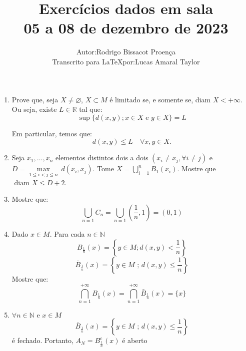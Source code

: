 \documentclass[12pt]{article}
\title{Exercícios dados em sala\\ 05 a 08 de dezembro de 2023}
\author{
    \begin{tabular}{rl}
        Autor: & Rodrigo Bissacot Proença \\
        Transcrito para \LaTeX por: & Lucas Amaral Taylor
    \end{tabular}
}
\begin{document}
\maketitle
\begin{enumerate}
    \item Prove que, seja $X \neq \varnothing$, $X \subset M$ é limitado se, e somente se, diam $X<+\infty$. Ou seja, existe $L \in \mathbb{R}$ tal que:
    \begin{equation*}
        \sup\{d(x, y) ; x \in X \text{ e } y \in X\}=L
    \end{equation*}

    Em particular, temos que:
    \begin{equation*}
    d(x, y) \leqslant L \quad \forall x, y \in X .
    \end{equation*}

    \item Seja $x_1, \ldots, x_n$ elementos distintos dois a dois $\left(x_i \neq x_j, \forall i \neq j\right)$ e $D = \underset{1 \leq i < j \leq n}{\max}\ d(x_i, x_j)$. Tome $X=\bigcup_{i=1}^n B_1\left(x_i\right)$. Mostre que $\text{ diam } X \leq D + 2$.

    \item Mostre que:
    \begin{equation*}
        \bigcup_{n=1} C_n=\bigcup_{n=1}\left(\frac{1}{n}, 1\right)=(0,1)
    \end{equation*}

    \item Dado $x \in M$. Para cada $n \in \mathbb{N}$
    \begin{equation*}
        B_{\frac{1}{n}}(x)=\left\{y \in M ; d(x, y)<\frac{1}{n}\right\} 
    \end{equation*}
    \begin{equation*}
        \bar{B}_{\frac{1}{n}}(x)=\left\{y \in M \text{ ; } d(x, y) \leqslant \frac{1}{n}\right\} 
    \end{equation*}
    Mostre que:
    \begin{equation*}
        \bigcap_{n=1}^{+\infty} B_{\frac{1}{n}}(x)=\bigcap_{n=1}^{+\infty} \bar{B}_{\frac{1}{n}}(x)=\{x\}
    \end{equation*}

    \item $\forall n \in \mathbb{N} \text{ e } x \in M$ 
    \begin{equation*}
        \bar{B}_{\frac{1}{n}}(x)=\left\{y \in M \text{ ; } d(x, y) \leq \frac{1}{n}\right\} 
    \end{equation*}
    é fechado. Portanto, $A_N=B_{\frac{1}{n}}^c(x)$ é aberto


\end{enumerate}
\end{document}
